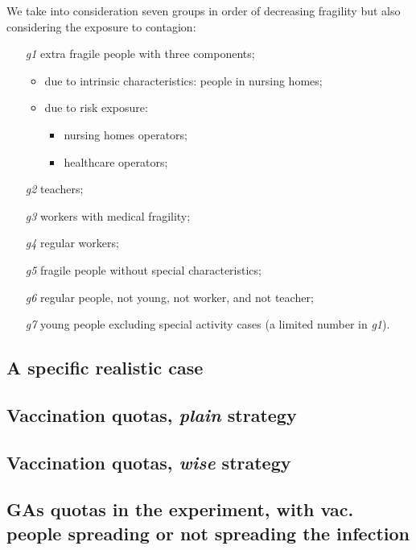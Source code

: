 \documentclass[graybox]{svmult}
\begin{document}
We take into consideration seven groups in order of decreasing fragility but also considering the exposure to contagion:

\begin{enumerate}
\item [\emph{g1}]
	extra fragile people with three components;
	\begin{itemize}
		\item due to intrinsic characteristics: people in nursing homes;
		\item due to risk exposure:
		\begin{itemize}
			\item nursing homes operators;
			\item healthcare operators;
 		\end{itemize} 
 	\end{itemize}  
\item [\emph{g2}]
	teachers;
\item [\emph{g3}]
	workers with medical fragility;
\item [\emph{g4}]
	regular workers;
\item [\emph{g5}]
	fragile people without special characteristics;
\item [\emph{g6}]
	regular people, not young, not worker, and not teacher;
\item [\emph{g7}]
	young people excluding special activity cases (a limited number in \emph{g1}).
\end{enumerate}


\subsection{A specific realistic case}
\label{specific}

\subsection{Vaccination quotas, \emph{plain} strategy}
\label{palin}


\subsection{Vaccination quotas, \emph{wise} strategy}
\label{wise}


\subsection{GAs quotas in the experiment, with vac. people spreading or not spreading the infection}
\label{GAquotas}
\end{document}
